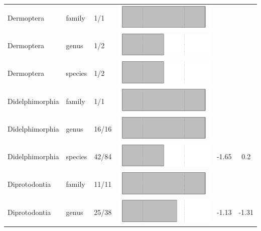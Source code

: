 \begin{longtable}{lL{1.8cm}C{2cm}lcc}
  Dermoptera & family & 1/1 & \includegraphics[width=0.20\linewidth, height=0.05\linewidth]{Supplementaries/Figures/MissingMammals/Results_1c/Table_figures/bar19.pdf} &   &   \\ 
  Dermoptera & genus & 1/2 & \includegraphics[width=0.20\linewidth, height=0.05\linewidth]{Supplementaries/Figures/MissingMammals/Results_1c/Table_figures/bar20.pdf} &   &   \\ 
  Dermoptera & species & 1/2 & \includegraphics[width=0.20\linewidth, height=0.05\linewidth]{Supplementaries/Figures/MissingMammals/Results_1c/Table_figures/bar21.pdf} &   &   \\ 
  Didelphimorphia & family & 1/1 & \includegraphics[width=0.20\linewidth, height=0.05\linewidth]{Supplementaries/Figures/MissingMammals/Results_1c/Table_figures/bar22.pdf} &   &   \\ 
  Didelphimorphia & genus & 16/16 & \includegraphics[width=0.20\linewidth, height=0.05\linewidth]{Supplementaries/Figures/MissingMammals/Results_1c/Table_figures/bar23.pdf} &   &   \\ 
  Didelphimorphia & species & 42/84 & \includegraphics[width=0.20\linewidth, height=0.05\linewidth]{Supplementaries/Figures/MissingMammals/Results_1c/Table_figures/bar24.pdf} & -1.65 & 0.2 \\ 
  Diprotodontia & family & 11/11 & \includegraphics[width=0.20\linewidth, height=0.05\linewidth]{Supplementaries/Figures/MissingMammals/Results_1c/Table_figures/bar25.pdf} &   &   \\ 
  Diprotodontia & genus & 25/38 & \includegraphics[width=0.20\linewidth, height=0.05\linewidth]{Supplementaries/Figures/MissingMammals/Results_1c/Table_figures/bar26.pdf} & -1.13 & -1.31 \\ 

\end{longtable}
